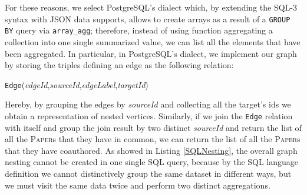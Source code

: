For these reasons, we select PostgreSQL's dialect which, by extending the SQL-3 syntax with JSON data supports, allows to create arrays as a result of a \texttt{GROUP BY} query via \texttt{array\_agg}; therefore, instead of using function aggregating a collection into one single summarized value, we can list all the elements that have been aggregated. In particular, in PostgreSQL's dialect, we  implement our graph by  storing the triples defining an edge as the following relation:
\begin{center}
 \texttt{Edge}(\textit{edgeId},\;\textit{sourceId},\;\textit{edgeLabel},\;\textit{targetId})
\end{center}
Hereby, by grouping the edges by \textit{sourceId} and collecting all the target's ids we obtain a representation of nested vertices. Similarly, if we join the \texttt{Edge} relation with itself and group the join result by two distinct \textit{sourceId} and return the list of all the \textsc{Paper}s that they have in common, we can return the list of all the \textsc{Paper}s that they have coauthored. As showed in Listing \ref{SQLNesting}, the overall graph nesting cannot be created in one single SQL query, because by  the SQL language definition we cannot distinctively group the same dataset in different ways, but we must visit the same data twice and perform two distinct aggregations. 


